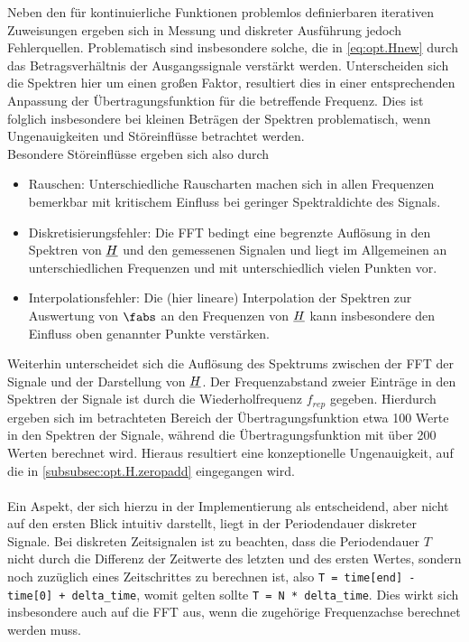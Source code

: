 \documentclass[../Report.tex]{subfiles}
\begin{document}
Neben den für kontinuierliche Funktionen problemlos definierbaren iterativen Zuweisungen ergeben sich in Messung und diskreter Ausführung jedoch Fehlerquellen. Problematisch sind insbesondere solche, die in \eqref{eq:opt.Hnew} durch das Betragsverhältnis der Ausgangssignale verstärkt werden. 
Unterscheiden sich die Spektren hier um einen großen Faktor, resultiert dies in einer entsprechenden Anpassung der Übertragungsfunktion für die betreffende Frequenz. Dies ist folglich insbesondere bei kleinen Beträgen der Spektren problematisch, wenn Ungenauigkeiten und Störeinflüsse betrachtet werden. 
\\
Besondere Störeinflüsse ergeben sich also durch
\begin{itemize}
	\item Rauschen: Unterschiedliche Rauscharten machen sich in allen Frequenzen bemerkbar mit kritischem Einfluss bei geringer Spektraldichte des Signals.\cite[S. 205 ff.]{lerch10}
	
	\item Diskretisierungsfehler: Die FFT bedingt eine begrenzte Auflösung in den Spektren von $\underline{H}$ und den gemessenen Signalen und liegt im Allgemeinen an unterschiedlichen Frequenzen und mit unterschiedlich vielen Punkten vor.
	
	\item Interpolationsfehler: Die (hier lineare) Interpolation der Spektren zur Auswertung von $\fabs$ an den Frequenzen von $\underline{H}$ kann insbesondere den Einfluss oben genannter Punkte verstärken.
\end{itemize}

\noindent
Weiterhin unterscheidet sich die Auflösung des Spektrums zwischen der FFT der Signale und der Darstellung von $\underline{H}$. Der Frequenzabstand zweier Einträge in den Spektren der Signale ist durch die Wiederholfrequenz $f_{rep}$ gegeben. Hierdurch ergeben sich im betrachteten Bereich der Übertragungsfunktion etwa 100 Werte in den Spektren der Signale, während die Übertragungsfunktion mit über 200 Werten berechnet wird. Hieraus resultiert eine konzeptionelle Ungenauigkeit, auf die in \ref{subsubsec:opt.H.zeropadd} eingegangen wird. 
\\
\\
Ein Aspekt, der sich hierzu in der Implementierung als entscheidend, aber nicht auf den ersten Blick intuitiv darstellt, liegt in der Periodendauer diskreter Signale. Bei diskreten Zeitsignalen ist zu beachten, dass die Periodendauer $T$ nicht durch die Differenz der Zeitwerte des letzten und des ersten Wertes, sondern noch zuzüglich eines Zeitschrittes  zu berechnen ist, also \lstinline{T = time[end] - time[0] + delta_time}, womit gelten sollte \lstinline{T = N * delta_time}. Dies wirkt sich insbesondere auch auf die FFT aus, wenn die zugehörige Frequenzachse berechnet werden muss.
\\
\\
\newpage
\end{document}
